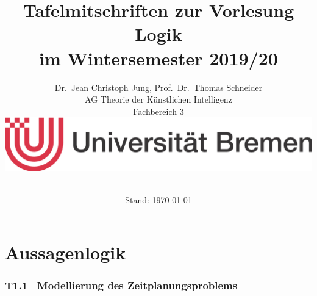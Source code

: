 \documentclass[fontsize=11pt, twoside=false, numbers=autoenddot]{scrbook}
\title{Tafelmitschriften zur Vorlesung \glqq Logik\grqq\\ im Wintersemester 2019/20}
\author{%
  Dr.\ Jean Christoph Jung, Prof.\ Dr.\ Thomas Schneider\\[1pt]
  AG Theorie der Künstlichen Intelligenz \\[1pt]
  Fachbereich 3 \\
  \includegraphics[width=.4\linewidth]{logo_ub.jpg} \\[\baselineskip]~%
}
\date{Stand: \today}
\begin{document}
\maketitle
\tableofcontents

\part{Aussagenlogik}

\section*{T1.1~ Modellierung des Zeitplanungsproblems}
\end{document}
